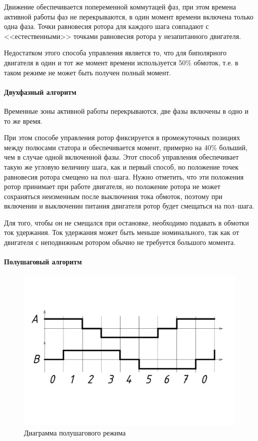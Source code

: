 Движение обеспечивается попеременной коммутацей фаз, при этом времена активной работы фаз
не перекрываются, в один момент времени включена только одна фаза. Точки равновесия
ротора для каждого шага совпадают с <<естественными>> точками равновесия ротора у
незапитанного двигателя.

Недостатком этого способа управления является то, что для биполярного двигателя в
один и тот же момент времени используется 50\% обмоток, т.е. в таком
режиме не может быть получен полный момент.

\paragraph{Двухфазный алгоритм}

Временные зоны активной работы перекрываются, две фазы включены в одно и то же
время.

При этом способе управления ротор фиксируется в промежуточных позициях между
полюсами статора и обеспечивается момент, примерно на 40\% больший, чем в случае
одной включенной фазы. Этот способ управления обеспечивает такую же угловую
величину шага, как и первый способ, но положение точек равновесия ротора смещено
на пол--шага. Нужно отметить, что эти положения ротор принимает при работе двигателя,
но положение ротора не может сохраняться неизменным после выключения тока обмоток,
поэтому при включении и выключении питания двигателя ротор будет смещаться на
пол--шага.

Для того, чтобы он не смещался при остановке, необходимо подавать в обмотки ток
удержания. Ток удержания может быть меньше номинального, так как от двигателя с
неподвижным ротором обычно не требуется большого момента.

\paragraph{Полушаговый алгоритм}
\label{section_half_phase_algo}

\begin{figure}
    \centering
    \includegraphics[width=0.8\linewidth, keepaspectratio, trim=30mm 0mm 30mm 0mm]
                    {./src/pictures/control_algo/half_phase_algo_vector.pdf}
    \caption{Диаграмма полушагового режима}
    \label{pic_half_phase_algo}
\end{figure}

